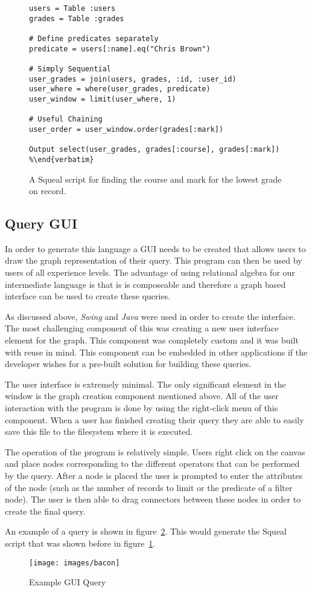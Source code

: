 \begin{figure}
\begin{lstlisting}
users = Table :users
grades = Table :grades

# Define predicates separately
predicate = users[:name].eq("Chris Brown")

# Simply Sequential
user_grades = join(users, grades, :id, :user_id)
user_where = where(user_grades, predicate)
user_window = limit(user_where, 1)

# Useful Chaining
user_order = user_window.order(grades[:mark])

Output select(user_grades, grades[:course], grades[:mark])
%\end{verbatim}
\end{lstlisting}
  \caption{A Squeal script for finding the course and mark for the lowest
  grade on record.}
  \label{fig:squeal}
\end{figure}

\subsection{Query GUI}

In order to generate this language a \ac{GUI} needs to be created that allows
users to draw the graph representation of their query. This program can then be
used by users of all experience levels. The advantage of using relational
algebra for our intermediate language is that is is composeable and therefore
a graph based interface can be used to create these queries.

As discussed above, \emph{Swing} and \emph{Java} were used in order to create
the interface. The most challenging component of this was creating a new user
interface element for the graph. This component was completely custom and it
was built with reuse in mind. This component can be embedded in other
applications if the developer wishes for a pre-built solution for building
these queries.

The user interface is extremely minimal. The only significant element in the
window is the graph creation component mentioned above. All of the user
interaction with the program is done by using the right-click menu of this
component. When a user has finished creating their query they are able to
easily save this file to the filesystem where it is executed.

The operation of the program is relatively simple. Users right click on the
canvas and place nodes corresponding to the different operators that can be
performed by the query. After a node is placed the user is prompted to enter
the attributes of the node (such as the number of records to limit or the
predicate of a filter node). The user is then able to drag connectors between
these nodes in order to create the final query.

An example of a query is shown in figure~\ref{fig:bacon}. This would generate
the Squeal script that was shown before in figure~\ref{fig:squeal}.

\begin{figure}
  \centering
  \texttt{[image: images/bacon]}
  \caption{Example GUI Query}
  \label{fig:bacon}
\end{figure}
